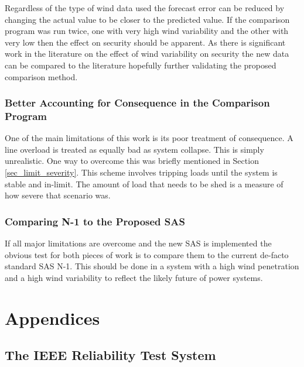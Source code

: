 \documentclass[a4paper,oneside,12pt]{report}
\begin{document}
Regardless of the type of wind data used the forecast error can be reduced by changing the actual value to be closer to the predicted value. If the comparison program was run twice, one with very high wind variability and the other with very low then the effect on security should be apparent. As there is significant work in the literature on the effect of wind variability on security the new data can be compared to the literature hopefully further validating the proposed comparison method.

\section{Better Accounting for Consequence in the Comparison Program}

One of the main limitations of this work is its poor treatment of consequence. A line overload is treated as equally bad as system collapse. This is simply unrealistic. One way to overcome this was briefly mentioned in Section \ref{sec_limit_severity}. This scheme involves tripping loads until the system is stable and in-limit. The amount of load that needs to be shed is a measure of how severe that scenario was.

\section{Comparing N-1 to the Proposed SAS}

If all major limitations are overcome and the new SAS is implemented the obvious test for both pieces of work is to compare them to the current de-facto standard SAS N-1. This should be done in a system with a high wind penetration and a high wind variability to reflect the likely future of power systems.


\appendix

\part*{Appendices}


\chapter{The IEEE Reliability Test System}\label{paper_rts}



\end{document}
